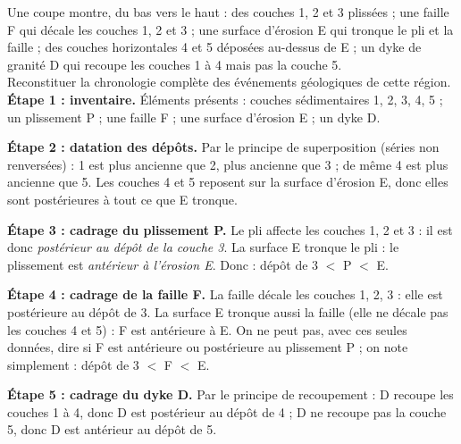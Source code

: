 \documentclass[11pt]{article}
\newcommand{\cle}[1]{{\popxbold\color{popdark}#1}}
\begin{document}
\begin{exoresolu}
Une coupe montre, du bas vers le haut : des couches 1, 2 et 3 plissées ; une faille F qui décale les couches 1, 2 et 3 ; une surface d'érosion E qui tronque le pli et la faille ; des couches horizontales 4 et 5 déposées au-dessus de E ; un dyke de granité D qui recoupe les couches 1 à 4 mais pas la couche 5.\\
Reconstituer la chronologie complète des événements géologiques de cette région.
\tcblower
\textbf{Étape 1 : inventaire.} Éléments présents : couches sédimentaires 1, 2, 3, 4, 5 ; un plissement P ; une faille F ; une surface d'érosion E ; un dyke D.

\textbf{Étape 2 : datation des dépôts.} Par le \cle{principe de superposition} (séries non renversées) : 1 est plus ancienne que 2, plus ancienne que 3 ; de même 4 est plus ancienne que 5. Les couches 4 et 5 reposent sur la surface d'érosion E, donc elles sont postérieures à tout ce que E tronque.

\textbf{Étape 3 : cadrage du plissement P.} Le pli affecte les couches 1, 2 et 3 : il est donc \emph{postérieur au dépôt de la couche 3}. La surface E tronque le pli : le plissement est \emph{antérieur à l'érosion E}. Donc : dépôt de 3 $<$ P $<$ E.

\textbf{Étape 4 : cadrage de la faille F.} La faille décale les couches 1, 2, 3 : elle est postérieure au dépôt de 3. La surface E tronque aussi la faille (elle ne décale pas les couches 4 et 5) : F est antérieure à E. On ne peut pas, avec ces seules données, dire si F est antérieure ou postérieure au plissement P ; on note simplement : dépôt de 3 $<$ F $<$ E.

\textbf{Étape 5 : cadrage du dyke D.} Par le \cle{principe de recoupement} : D recoupe les couches 1 à 4, donc D est postérieur au dépôt de 4 ; D ne recoupe pas la couche 5, donc D est antérieur au dépôt de 5.


\end{exoresolu}
\end{document}
